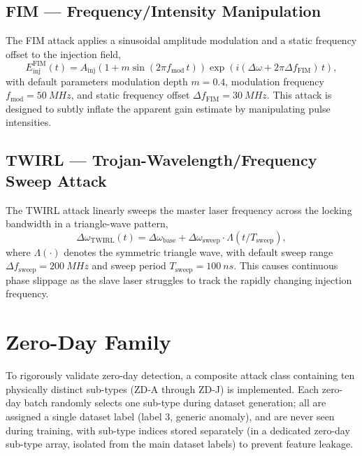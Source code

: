 \documentclass[12pt, a4paper]{report}
\begin{document}
\subsection{FIM — Frequency/Intensity Manipulation}
The FIM attack applies a sinusoidal amplitude modulation and a static frequency offset to the injection field,
\begin{equation}
    E_{\text{inj}}^{\text{FIM}}(t) = A_{\text{inj}}\left(1 + m \sin(2\pi f_{\text{mod}}\, t)\right) \exp\!\left(i(\Delta\omega + 2\pi\Delta f_{\text{FIM}})\, t\right),
\end{equation}
with default parameters modulation depth $m = 0.4$, modulation frequency $f_{\text{mod}} = \SI{50}{MHz}$, and static frequency offset $\Delta f_{\text{FIM}} = \SI{30}{MHz}$. This attack is designed to subtly inflate the apparent gain estimate by manipulating pulse intensities.

\subsection{TWIRL — Trojan-Wavelength/Frequency Sweep Attack}
The TWIRL attack linearly sweeps the master laser frequency across the locking bandwidth in a triangle-wave pattern,
\begin{equation}
    \Delta\omega_{\text{TWIRL}}(t) = \Delta\omega_{\text{base}} + \Delta\omega_{\text{sweep}} \cdot \Lambda(t / T_{\text{sweep}}),
\end{equation}
where $\Lambda(\cdot)$ denotes the symmetric triangle wave, with default sweep range $\Delta f_{\text{sweep}} = \SI{200}{MHz}$ and sweep period $T_{\text{sweep}} = \SI{100}{ns}$. This causes continuous phase slippage as the slave laser struggles to track the rapidly changing injection frequency.

\section{Zero-Day Family}\label{sec:zero_day}
To rigorously validate zero-day detection, a composite attack class containing ten physically distinct sub-types (ZD-A through ZD-J) is implemented. Each zero-day batch randomly selects one sub-type during dataset generation; all are assigned a single dataset label (label 3, generic anomaly), and are never seen during training, with sub-type indices stored separately (in a dedicated zero-day sub-type array, isolated from the main dataset labels) to prevent feature leakage.
\end{document}
